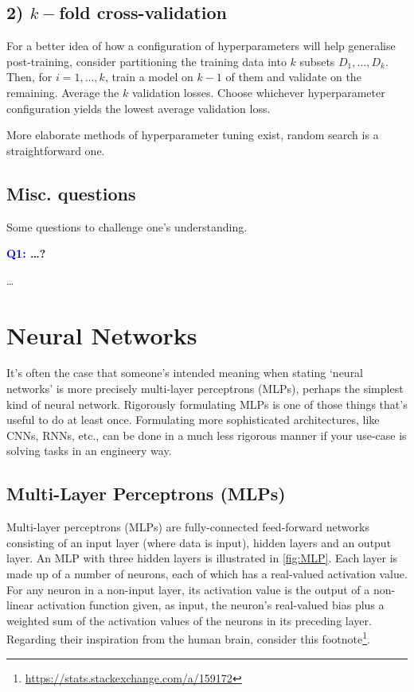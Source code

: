 \documentclass[11pt]{article}
\begin{document}
\subsection*{2) $k-$fold cross-validation}
For a better idea of how a configuration of hyperparameters will help generalise post-training, consider partitioning the training data into $k$ subsets $D_1,\dots,D_k$. Then, for $i=1,\dots,k$, train a model on $k-1$ of them and validate on the remaining. Average the $k$ validation losses. Choose whichever hyperparameter configuration yields the lowest average validation loss.

More elaborate methods of hyperparameter tuning exist, random search is a straightforward one.


\subsection{Misc. questions}

Some questions to challenge one's understanding.

\begin{center}
    \textbf{\textcolor{blue}{Q1:} \dots?}
\end{center}
\dots

\section{Neural Networks}
It's often the case that someone's intended meaning when stating `neural networks' is more precisely multi-layer perceptrons (MLPs), perhaps the simplest kind of neural network. Rigorously formulating MLPs is one of those things that's useful to do at least once. Formulating more sophisticated architectures, like CNNs, RNNs, etc., can be done in a much less rigorous manner if your use-case is solving tasks in an engineery way.

\subsection{Multi-Layer Perceptrons (MLPs)}
\label{sec:multi_layer_perceptrons}

Multi-layer perceptrons (MLPs) are fully-connected feed-forward networks consisting of an input layer (where data is input), hidden layers and an output layer. An MLP with three hidden layers is illustrated in \autoref{fig:MLP}. Each layer is made up of a number of neurons, each of which has a real-valued activation value.  For any neuron in a non-input layer, its activation value is the output of a non-linear activation function given, as input, the neuron's real-valued bias plus a weighted sum of the activation values of the neurons in its preceding layer. Regarding their inspiration from the human brain, consider this footnote\footnote{\url{https://stats.stackexchange.com/a/159172}}.
\end{document}
